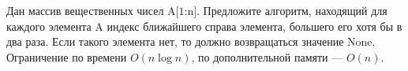 \documentclass{article}
\begin{document}
Дан массив вещественных чисел $\text{A[1:n]}$. Предложите алгоритм, находящий для каждого элемента $\text{A}$ индекс ближайшего справа элемента,
большего его хотя бы в два раза. Если такого элемента нет, то должно возвращаться значение $\text{None}$. Ограничение по времени $O(n \log n)$,
по дополнительной памяти --- $O(n)$.
\end{document}
